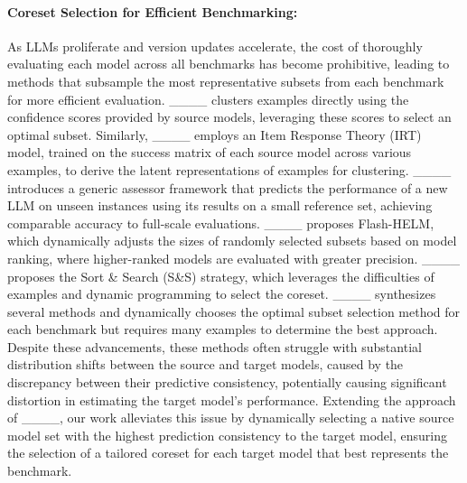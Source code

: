 \paragraph{Coreset Selection for Efficient Benchmarking:} As LLMs proliferate and version updates accelerate, the cost of thoroughly evaluating each model across all benchmarks has become prohibitive, leading to methods that subsample the most representative subsets from each benchmark for more efficient evaluation. ____ clusters examples directly using the confidence scores provided by source models, leveraging these scores to select an optimal subset. Similarly, ____ employs an Item Response Theory (IRT) model, trained on the success matrix of each source model across various examples, to derive the latent representations of examples for clustering. ____ introduces a generic assessor framework that predicts the performance of a new LLM on unseen instances using its results on a small reference set, achieving comparable accuracy to full-scale evaluations. ____ proposes Flash-HELM, which dynamically adjusts the sizes of randomly selected subsets based on model ranking, where higher-ranked models are evaluated with greater precision. ____ proposes the Sort \& Search (S\&S) strategy, which leverages the difficulties of examples and dynamic programming to select the coreset. 
____ synthesizes several methods and dynamically chooses the optimal subset selection method for each benchmark but requires many examples to determine the best approach. Despite these advancements, these methods often struggle with substantial distribution shifts between the source and target models, caused by the discrepancy between their predictive consistency, potentially causing significant distortion in estimating the target model's performance. 
Extending the approach of ____, our work alleviates this issue by dynamically selecting a native source model set with the highest prediction consistency to the target model, ensuring the selection of a tailored coreset for each target model that best represents the benchmark.

